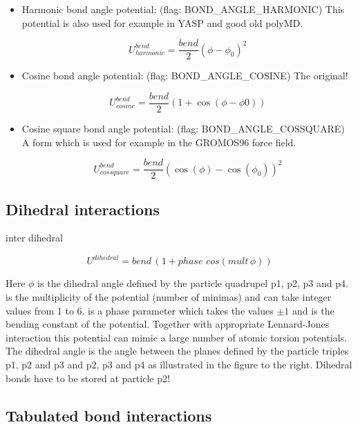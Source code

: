 \begin{itemize}
\item Harmonic bond angle potential: (flag: BOND_ANGLE_HARMONIC)
  This potential is also used for example in YASP and good old polyMD.

      \[ U^{bend}_{harmonic} = \frac{bend}{2} (\phi - \phi_0)^2 \]

    \item Cosine bond angle potential: (flag: BOND_ANGLE_COSINE) The
      \es{} original!

      \[ U^{bend}_{cosine} = \frac{bend}{2} (1 + \cos(\phi - \phi0)) \]

    \item Cosine square bond angle potential: (flag:
      BOND_ANGLE_COSSQUARE) A form which is used for example in the
      GROMOS96 force field.

      \[ U^{bend}_{cossquare} = \frac{bend}{2} (\cos(\phi) - \cos(\phi_0))^2 \] 
\end{itemize}

\subsection{Dihedral interactions}

\begin{essyntax}
  inter  
  dihedral   
\end{essyntax}

\[ U^{dihedral} = bend \, (1 + phase \, \, cos(mult \, \phi)) \]

Here $\phi$ is the dihedral angle defined by the particle quadrupel
p1, p2, p3 and p4.  is the multiplicity of the potential
(number of minimas) and can take integer values from 1 to 6.
 is a phase parameter which takes the values $\pm1$ and
 is the bending constant of the potential. Together with
appropriate Lennard-Jones interaction this potential can mimic a large
number of atomic torsion potentials. The dihedral angle is the angle
between the planes defined by the particle triples p1, p2 and p3 and
p2, p3 and p4 as illustrated in the figure to the right. Dihedral
bonds have to be stored at particle p2!

\subsection{Tabulated bond interactions}

